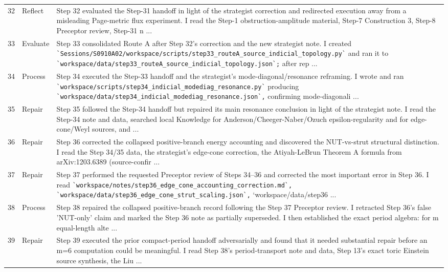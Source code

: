 \documentclass[UTF8,fontset=fandol,zihao=-4]{ctexart}
\begin{document}
\begin{longtable}{r p{} >{\raggedright\arraybackslash}p{}}
32 & Reflect & Step 32 evaluated the Step-31 handoff in light of the strategist correction and redirected execution away from a misleading Page-metric flux experiment. I read the Step-1 obstruction-amplitude material, Step-7 Construction 3, Step-8 Preceptor review, Step-31 n ...\\
33 & Evaluate & Step 33 consolidated Route A after Step 32's correction and the new strategist note. I created \nolinkurl{`Sessions/S0910A02/workspace/scripts/step33_routeA_source_indicial_topology.py`} and ran it to \nolinkurl{`workspace/data/step33_routeA_source_indicial_topology.json`;} after rep ...\\
34 & Process & Step 34 executed the Step-33 handoff and the strategist's mode-diagonal/resonance reframing. I wrote and ran \nolinkurl{`workspace/scripts/step34_indicial_modediag_resonance.py`} producing \nolinkurl{`workspace/data/step34_indicial_modediag_resonance.json`,} confirming mode-diagonali ...\\
35 & Repair & Step 35 followed the Step-34 handoff but repaired its main resonance conclusion in light of the strategist note. I read the Step-34 note and data, searched local Knowledge for Anderson/Cheeger-Naber/Ozuch epsilon-regularity and for edge-cone/Weyl sources, and  ...\\
36 & Repair & Step 36 corrected the collapsed positive-branch energy accounting and discovered the NUT-vs-strut structural distinction. I read the Step 34/35 data, the strategist's edge-cone correction, the Atiyah-LeBrun Theorem A formula from arXiv:1203.6389 (source-confir ...\\
37 & Repair & Step 37 performed the requested Preceptor review of Steps 34--36 and corrected the most important error in Step 36. I read \nolinkurl{`workspace/notes/step36_edge_cone_accounting_correction.md`,} \nolinkurl{`workspace/data/step36_edge_cone_strut_scaling.json`,} `workspace/data/step36 ...\\
38 & Process & Step 38 repaired the collapsed positive-branch record following the Step 37 Preceptor review. I retracted Step 36's false 'NUT-only' claim and marked the Step 36 note as partially superseded. I then established the exact period algebra: for m equal-length alte ...\\
39 & Repair & Step 39 executed the prior compact-period handoff adversarially and found that it needed substantial repair before an m=6 computation could be meaningful. I read Step 38's period-transport note and data, Step 13's exact toric Einstein source synthesis, the Liu ...\\

\end{longtable}
\end{document}
